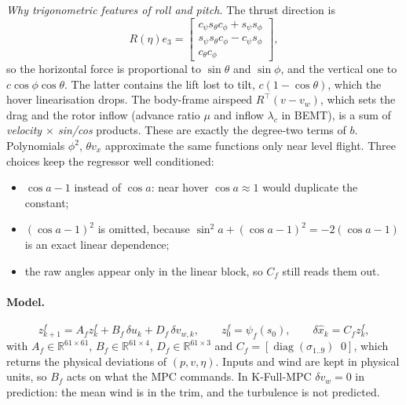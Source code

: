 \documentclass[11pt,a4paper]{article}
\newcommand{\KFullMPC}{\textsf{K-Full-MPC}}   %
\newcommand{\diag}{\operatorname{diag}}
\begin{document}
	\emph{Why trigonometric features of roll and pitch.} The thrust direction is
	\begin{equation}
		R(\eta)e_3 = \begin{bmatrix} c_\psi s_\theta c_\phi + s_\psi s_\phi \\ s_\psi s_\theta c_\phi - c_\psi s_\phi \\ c_\theta c_\phi \end{bmatrix},
	\end{equation}
	so the horizontal force is proportional to $\sin\theta$ and $\sin\phi$, and the vertical one to
	$c\cos\phi\cos\theta$. The latter contains the lift lost to tilt, $c(1 - \cos\theta)$, which the
	hover linearisation drops. The body-frame airspeed $R^\top(v - v_w)$, which sets the drag and
	the rotor inflow (advance ratio $\mu$ and inflow $\lambda_c$ in BEMT), is a sum of
	\emph{velocity $\times$ sin/cos} products. These are exactly the degree-two terms of $b$.
	Polynomials $\phi^2$, $\theta v_x$ approximate the same functions only near level flight.
	Three choices keep the regressor well conditioned:
	\begin{itemize}[leftmargin=*]
		\item $\cos a - 1$ instead of $\cos a$: near hover $\cos a \approx 1$ would duplicate the constant;
		\item $(\cos a - 1)^2$ is omitted, because
		$\sin^2 a + (\cos a - 1)^2 = -2(\cos a - 1)$ is an exact linear dependence;
		\item the raw angles appear only in the linear block, so $C_f$ still reads them out.
	\end{itemize}

	\paragraph{Model.}
	\begin{equation}
		\boxed{\;
			z^f_{k+1} = A_f z^f_k + B_f\,\delta u_k + D_f\,\delta v_{w,k}, \qquad
			z^f_0 = \psi_f(s_0), \qquad
			\delta\hat{x}_k = C_f z^f_k,
			\;}
		\label{eqn:kfull}
	\end{equation}
	with $A_f \in \mathbb{R}^{61\times61}$, $B_f \in \mathbb{R}^{61\times4}$,
	$D_f \in \mathbb{R}^{61\times3}$ and $C_f = [\diag(\sigma_{1..9})\;\; 0]$, which returns the physical
	deviations of $(p, v, \eta)$. Inputs and wind are kept in physical units, so $B_f$ acts on what
	the MPC commands. In \KFullMPC{} $\delta v_w = 0$ in prediction: the mean wind is in the trim,
	and the turbulence is not predicted.
\end{document}

